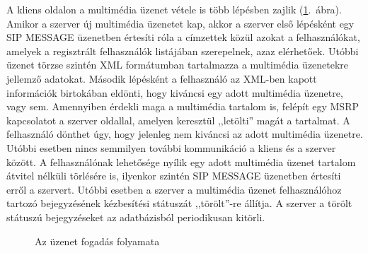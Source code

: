 A kliens oldalon a multimédia üzenet vétele is több lépésben zajlik (\ref{fig:receiving_proc}.~ábra). Amikor a szerver új multimédia üzenetet kap, akkor a szerver első lépésként egy SIP MESSAGE üzenetben értesíti róla a címzettek közül azokat a felhasználókat, amelyek a regisztrált felhasználók listájában szerepelnek, azaz elérhetőek. Utóbbi üzenet törzse szintén XML formátumban tartalmazza a multimédia üzenetekre jellemző adatokat. Második lépésként a felhasználó az XML-ben kapott információk birtokában eldönti, hogy kiváncsi egy adott multimédia üzenetre, vagy sem. Amennyiben érdekli maga a multimédia tartalom is, felépít egy MSRP kapcsolatot a szerver oldallal, amelyen keresztül ,,letölti'' magát a tartalmat. A felhasználó dönthet úgy, hogy jelenleg nem kiváncsi az adott multimédia üzenetre. Utóbbi esetben nincs semmilyen további kommunikáció a kliens és a szerver között. A felhasználónak lehetősége nyílik egy adott multimédia üzenet tartalom átvitel nélküli törlésére is, ilyenkor szintén SIP MESSAGE üzenetben értesíti erről a szervert. Utóbbi esetben a szerver a multimédia üzenet felhasználóhoz tartozó bejegyzésének kézbesítési státuszát ,,törölt''-re állítja. A szerver a törölt státuszú bejegyzéseket az adatbázisból periodikusan kitörli.

\begin{figure}[htbp]
\center
{}
\caption{Az üzenet fogadás folyamata}
\label{fig:receiving_proc}
\end{figure}

